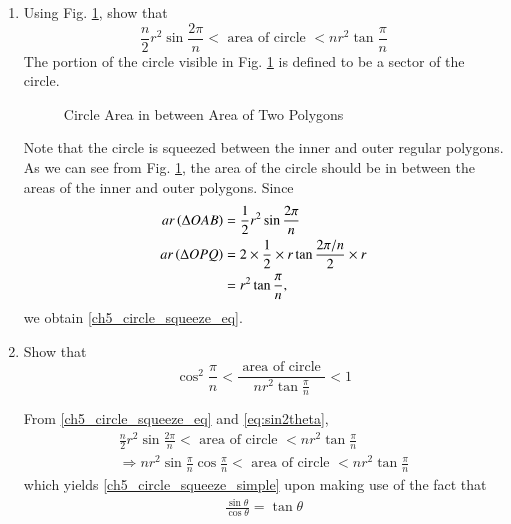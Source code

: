 \begin{enumerate}[label=\arabic*.,ref=\thesubsection.\theenumi]
\item
	Using Fig. \ref{ch5_circle_squeeze}, show that
%
\begin{equation}
\label{ch5_circle_squeeze_eq}
\frac{n}{2}r^{2}\sin\frac{2\pi}{n} < \text{ area of circle } < nr^{2}\tan\frac{\pi}{n}
\end{equation}
%
The portion of the circle visible in Fig. \ref{ch5_circle_squeeze} is defined to be a sector of the circle.

\begin{figure}[!ht]
	\begin{center}
		
		\resizebox{\columnwidth}{!}{}
	\end{center}
	\caption{Circle Area in between Area of Two Polygons}
	\label{ch5_circle_squeeze}	
\end{figure}
%

\solution Note that the circle is squeezed between the inner and outer regular polygons.  As we can see from Fig. \ref{ch5_circle_squeeze}, the area of the circle should be in between the areas of the inner and outer polygons.  Since
%
\begin{align}
ar \left(\Delta OAB\right) &= \frac{1}{2}r^{2}\sin\frac{2\pi}{n} \\
ar \left(\Delta OPQ\right) &= 2 \times \frac{1}{2} \times r \tan\frac{2\pi/n}{2} \times r \\
&= r^{2}\tan\frac{\pi}{n},
\end{align}
%
we obtain \eqref{ch5_circle_squeeze_eq}.
%
\item
Show that
	\begin{equation}
	\label{ch5_circle_squeeze_simple}
\cos^2\frac{\pi}{n} < \frac{\text{ area of circle }}{nr^{2}\tan\frac{\pi}{n}} < 1	\end{equation}

\solution From \eqref{ch5_circle_squeeze_eq} and \eqref{eq:sin2theta},
{\small
	\begin{align}
	\frac{n}{2}r^{2}\sin\frac{2\pi}{n} < \text{ area of circle } 
	< nr^{2}\tan\frac{\pi}{n} 
	\\
\Rightarrow 	
	{n}r^{2}\sin\frac{\pi}{n}\cos\frac{\pi}{n} < \text{ area of circle } 
	< nr^{2}\tan\frac{\pi}{n} 
	\end{align}
%
}
which yields 	\eqref{ch5_circle_squeeze_simple} upon making use of the fact that 
%
\begin{align}
\frac{\sin \theta}{\cos \theta} = \tan \theta
\end{align}
%


\end{enumerate}
